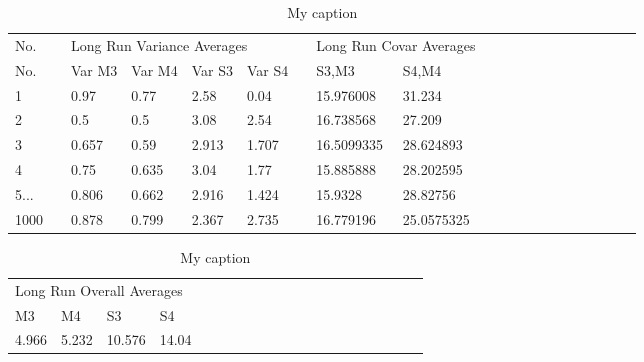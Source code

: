 \documentclass[12pt]{article}
\begin{document}
\begin{table}[H]
\centering
\caption{My caption}
\label{my-label}
\begin{tabular}{|l|l|l|l|l|l|l|l|l|lllllllllll}
\cline{1-9}
No.  &  & \multicolumn{4}{l|}{Long Run Variance Averages} &  & \multicolumn{2}{l|}{Long Run Covar Averages} &  &  &  &  &  &  &  &  &  &  &  \\ \cline{1-9}
No.  &  & Var M3     & Var M4     & Var S3    & Var S4    &  & S3,M3                 & S4,M4                &  &  &  &  &  &  &  &  &  &  &  \\ \cline{1-9}
1    &  & 0.97       & 0.77       & 2.58      & 0.04      &  & 15.976008             & 31.234               &  &  &  &  &  &  &  &  &  &  &  \\ \cline{1-9}
2    &  & 0.5        & 0.5        & 3.08      & 2.54      &  & 16.738568             & 27.209               &  &  &  &  &  &  &  &  &  &  &  \\ \cline{1-9}
3    &  & 0.657      & 0.59       & 2.913     & 1.707     &  & 16.5099335            & 28.624893            &  &  &  &  &  &  &  &  &  &  &  \\ \cline{1-9}
4    &  & 0.75       & 0.635      & 3.04      & 1.77      &  & 15.885888             & 28.202595            &  &  &  &  &  &  &  &  &  &  &  \\ \cline{1-9}
5... &  & 0.806      & 0.662      & 2.916     & 1.424     &  & 15.9328               & 28.82756             &  &  &  &  &  &  &  &  &  &  &  \\ \cline{1-9}
1000 &  & 0.878      & 0.799      & 2.367     & 2.735     &  & 16.779196             & 25.0575325           &  &  &  &  &  &  &  &  &  &  &  \\ \cline{1-9}
\end{tabular}
\end{table}


\begin{table}[h]
\centering
\caption{My caption}
\label{my-label}
\begin{tabular}{llllllllllllllllllll}
\cline{1-4}
\multicolumn{4}{|l|}{Long Run Overall Averages}                                                                     &  &  &  &  &  &  &  &  &  &  &  &  &  &  &  &  \\ \cline{1-4}
\multicolumn{1}{|l|}{M3}    & \multicolumn{1}{l|}{M4}    & \multicolumn{1}{l|}{S3}     & \multicolumn{1}{l|}{S4}    &  &  &  &  &  &  &  &  &  &  &  &  &  &  &  &  \\ \cline{1-4}
\multicolumn{1}{|l|}{4.966} & \multicolumn{1}{l|}{5.232} & \multicolumn{1}{l|}{10.576} & \multicolumn{1}{l|}{14.04} &  &  &  &  &  &  &  &  &  &  &  &  &  &  &  &  \\ \cline{1-4}
\end{tabular}
\end{table}
\end{document}
